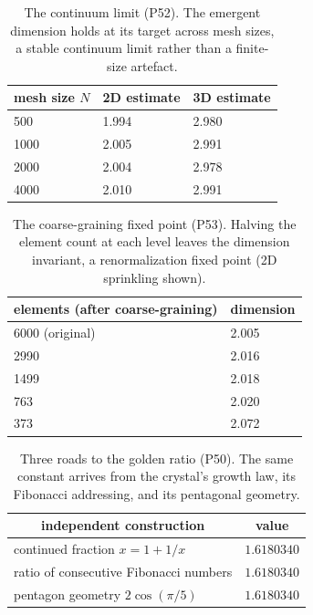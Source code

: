 \begin{table}[H]
\centering
\small
\begin{tabular}{lll}
\toprule
\multicolumn{1}{c}{mesh size $N$} & \multicolumn{1}{c}{2D estimate} & \multicolumn{1}{c}{3D estimate} \\
\midrule
500 & 1.994 & 2.980 \\
1000 & 2.005 & 2.991 \\
2000 & 2.004 & 2.978 \\
4000 & 2.010 & 2.991 \\
\bottomrule
\end{tabular}
\caption{The continuum limit (P52). The emergent dimension holds at its target across mesh sizes, a stable continuum limit rather than a finite-size artefact.}
\end{table}

\begin{table}[H]
\centering
\small
\begin{tabular}{ll}
\toprule
\multicolumn{1}{c}{elements (after coarse-graining)} & \multicolumn{1}{c}{dimension} \\
\midrule
6000 (original) & 2.005 \\
2990 & 2.016 \\
1499 & 2.018 \\
763 & 2.020 \\
373 & 2.072 \\
\bottomrule
\end{tabular}
\caption{The coarse-graining fixed point (P53). Halving the element count at each level leaves the dimension invariant, a renormalization fixed point (2D sprinkling shown).}
\end{table}

\begin{table}[H]
\centering
\small
\begin{tabular}{ll}
\toprule
\multicolumn{1}{c}{independent construction} & \multicolumn{1}{c}{value} \\
\midrule
continued fraction $x = 1 + 1/x$ & $1.6180340$ \\
ratio of consecutive Fibonacci numbers & $1.6180340$ \\
pentagon geometry $2\cos(\pi/5)$ & $1.6180340$ \\
\bottomrule
\end{tabular}
\caption{Three roads to the golden ratio (P50). The same constant arrives from the crystal's growth law, its Fibonacci addressing, and its pentagonal geometry.}
\end{table}

